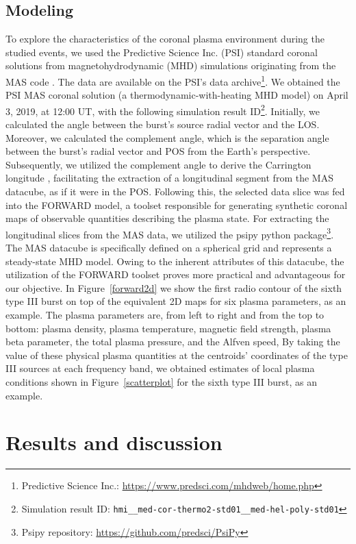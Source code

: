 \subsection{Modeling}
To explore the characteristics of the coronal plasma environment during the studied events, we used the Predictive Science Inc. (PSI) standard coronal solutions from magnetohydrodynamic (MHD) simulations originating from the MAS code \citep{mhd_1999}. The data are available on the PSI's data archive\footnote{Predictive Science Inc.: \url{https://www.predsci.com/mhdweb/home.php}}. We obtained the PSI MAS coronal solution (a thermodynamic-with-heating MHD model) on April 3, 2019, at 12:00 UT, with the following simulation result ID\footnote{Simulation result ID: \texttt{hmi\_\_med-cor-thermo2-std01\_\_med-hel-poly-std01}}.
Initially, we calculated the angle between the burst's source radial vector and the LOS. Moreover, we calculated the complement angle, which is the separation angle between the burst's radial vector and POS from the Earth's perspective.
Subsequently, we utilized the complement angle to derive the Carrington longitude \citep{thompson_2006}, facilitating the extraction of a longitudinal segment from the MAS datacube, as if it were in the POS. Following this, the selected data slice was fed into the FORWARD model, a toolset responsible for generating synthetic coronal maps of observable quantities describing the plasma state.
For extracting the longitudinal slices from the MAS data, we utilized the psipy python package\footnote{Psipy repository: \url{https://github.com/predsci/PsiPy}}.
The MAS datacube is specifically defined on a spherical grid and represents a steady-state MHD model. Owing to the inherent attributes of this datacube, the utilization of the FORWARD toolset proves more practical and advantageous for our objective.
In Figure~\ref{forward2d} we show the first radio contour of the sixth type III burst on top of the equivalent 2D maps for six plasma parameters, as an example. The plasma parameters are, from left to right and from the top to bottom: plasma density, plasma temperature, magnetic field strength, plasma beta parameter, the total plasma pressure, and the Alfven speed, By taking the value of these physical plasma quantities at the centroids' coordinates of the type III sources at each frequency band, we obtained estimates of local plasma conditions shown in Figure~\ref{scatterplot} for the sixth type III burst, as an example.

\section{Results and discussion}
\label{sec_ch3_results}
